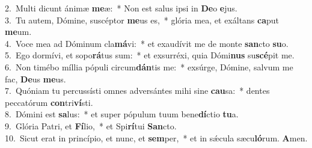 {2.~}Multi dicunt ánimæ \textbf{me}æ:~* Non est salus ipsi in \textbf{De}o \textbf{e}jus.\\
{3.~}Tu autem, Dómine, suscéptor \textbf{me}us es,~* glória mea, et exáltans \textbf{ca}put \textbf{me}um.\\
{4.~}Voce mea ad Dóminum cla\textbf{má}vi:~* et exaudívit me de monte \textbf{san}cto \textbf{su}o.\\
{5.~}Ego dormívi, et sopo\textbf{rá}tus sum:~* et exsurréxi, quia Dómi\textbf{nus} su\textbf{scé}pit me.\\
{6.~}Non timébo míllia pópuli circum\textbf{dán}tis me:~* exsúrge, Dómine, salvum me fac, \textbf{De}us \textbf{me}us.\\
{7.~}Quóniam tu percussísti omnes adversántes mihi sine \textbf{cau}sa:~* dentes peccatórum \textbf{con}tri\textbf{ví}sti.\\
{8.~}Dómini est \textbf{sa}lus:~* et super pópulum tuum bene\textbf{dí}ctio \textbf{tu}a.\\
{9.~}Glória Patri, et \textbf{Fí}lio,~* et Spi\textbf{rí}tui \textbf{San}cto.\\
{10.~}Sicut erat in princípio, et nunc, et \textbf{sem}per,~* et in sǽcula sæcu\textbf{ló}rum. \textbf{A}men.\\
